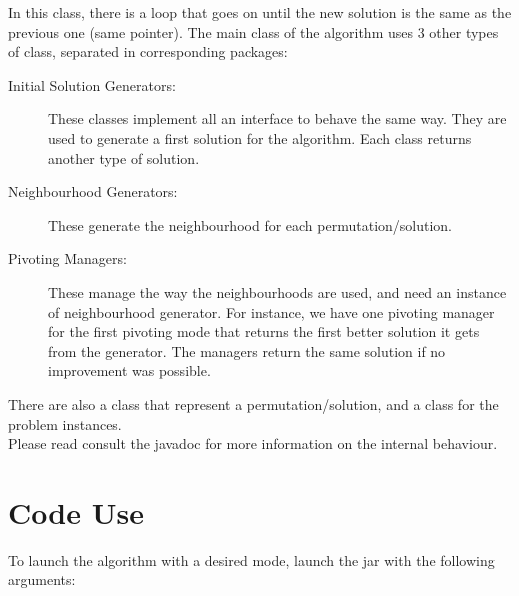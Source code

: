 In this class, there is a loop that goes on until the new solution is the same as the previous one (same pointer). The main class of the algorithm uses 3 other types of class, separated in corresponding packages:
\begin{description}
	\item[Initial Solution Generators:] These classes implement all an interface to behave the same way. They are used to generate a first solution for the algorithm. Each class returns another type of solution.

	\item[Neighbourhood Generators:] These generate the neighbourhood for each permutation/solution.
	\item[Pivoting Managers:] These manage the way the neighbourhoods are used, and need an instance of neighbourhood generator. For instance, we have one pivoting manager for the first pivoting mode that returns the first better solution it gets from the generator. The managers return the same solution if no improvement was possible.
\end{description}

There are also a class that represent a permutation/solution, and a class for the problem instances.\\

Please read consult the javadoc for more information on the internal behaviour.

\section{Code Use}
To launch the algorithm with a desired mode, launch the jar with the following arguments:

